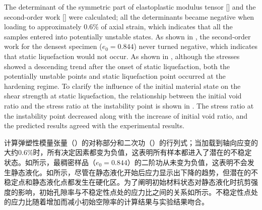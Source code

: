 \begin{ParaColumn}
    \switchcolumn*

    The determinant of the symmetric part of elastoplastic modulus tensor [] and the second-order work [] were calculated; all the determinants became negative when loading to approximately $0.6\%$ of axial strain, which indicates that all the samples entered into potentially unstable states. As shown in , the second-order work for the densest specimen ($e_0=0.844$) never turned negative, which indicates that static liquefaction would not occur. As shown in , although the stresses showed a descending trend after the onset of static liquefaction, both the potentially unstable points and static liquefaction point occurred at the hardening regime. To clarify the influence of the initial material state on the shear strength at static liquefaction, the relationship between the initial void ratio and the stress ratio at the instability point is shown in . The stress ratio at the instability point decreased along with the increase of initial void ratio, and the predicted results agreed with the experimental results.

    \switchcolumn

    计算弹塑性模量张量（）的对称部分和二次功（）的行列式；当加载到轴向应变的大约$0.6\%$时，所有决定因素都变为负值，这表明所有样本都进入了潜在的不稳定状态。如所示，最稠密样品（$e_0 = 0.844$）的二阶功从未变为负值，这表明不会发生静态液化。如所示，尽管在静态液化开始后应力显示出下降的趋势，但潜在的不稳定点和静态液化点都发生在硬化区。为了阐明初始材料状态对静态液化时抗剪强度的影响，初始孔隙率与不稳定性点处的应力比之间的关系如所示。不稳定性点处的应力比随着增加而减小初始空隙率的计算结果与实验结果吻合。

    \CrossColumnText{
        
    }

\end{ParaColumn}
